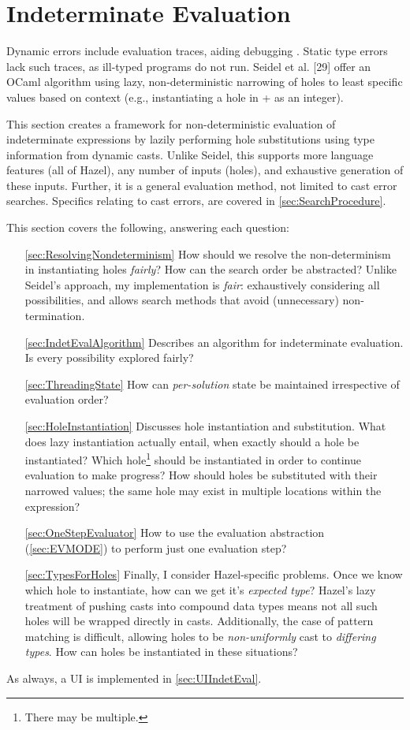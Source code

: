 \section{Indeterminate Evaluation}\label{sec:IndetEval}
Dynamic errors include evaluation traces, aiding debugging \cite{TraceVisualisation}. Static type errors lack such traces, as ill-typed programs do not run. Seidel et al. [29] offer an OCaml algorithm using lazy, non-deterministic narrowing of holes to least specific values based on context (e.g., instantiating a hole in + as an integer). 

This section creates a framework for non-deterministic evaluation of indeterminate expressions by lazily performing hole substitutions using type information from dynamic casts. Unlike Seidel, this supports more language features (all of Hazel), any number of inputs (holes), and exhaustive generation of these inputs. Further, it is a general evaluation method, not limited to cast error searches. Specifics relating to cast errors, are covered in \cref{sec:SearchProcedure}.

This section covers the following, answering each question:
\begin{enumerate}
\item[\ref{sec:ResolvingNondeterminism}] How should we resolve the non-determinism in instantiating holes \textit{fairly}? How can the search order be abstracted? Unlike Seidel's approach, my implementation is \textit{fair}: exhaustively considering all possibilities, and allows search methods that avoid (unnecessary) non-termination.
\item[\ref{sec:IndetEvalAlgorithm}] Describes an algorithm for indeterminate evaluation. Is every possibility explored fairly?
\item[\ref{sec:ThreadingState}] How can \textit{per-solution} state be maintained irrespective of evaluation order?
\item[\ref{sec:HoleInstantiation}] Discusses hole instantiation and substitution. What does lazy instantiation actually entail, when exactly should a hole be instantiated? Which hole\footnote{There may be multiple.} should be instantiated in order to continue evaluation to make progress? How should holes be substituted with their narrowed values; the same hole may exist in multiple locations within the expression?
\item[\ref{sec:OneStepEvaluator}] How to use the evaluation abstraction (\cref{sec:EVMODE}) to perform just one evaluation step?
\item[\ref{sec:TypesForHoles}] Finally, I consider Hazel-specific problems. Once we know which hole to instantiate, how can we get it's \textit{expected type}? Hazel's lazy treatment of pushing casts into compound data types means not all such holes will be wrapped directly in casts. Additionally, the case of pattern matching is difficult, allowing holes to be \textit{non-uniformly} cast to \textit{differing types}. How can holes be instantiated in these situations?
\end{enumerate}
As always, a UI is implemented in \cref{sec:UIIndetEval}.

